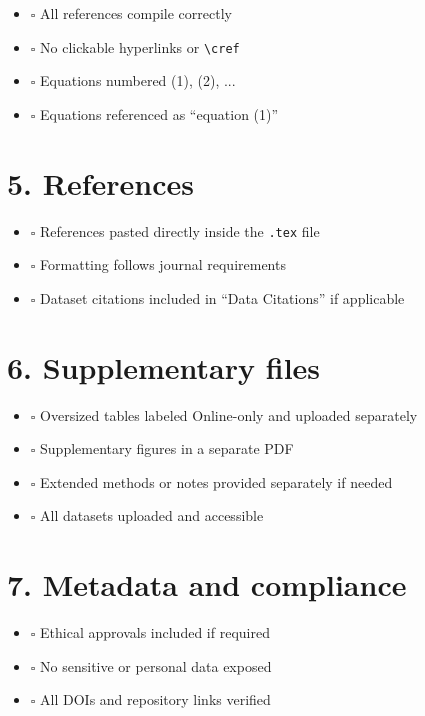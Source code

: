 \documentclass[11pt]{article}
\newcommand{\cbox}{$\square$ }
\begin{document}
\begin{itemize}[leftmargin=1.2cm]
    \item \cbox All references compile correctly
    \item \cbox No clickable hyperlinks or \texttt{\textbackslash cref}
    \item \cbox Equations numbered (1), (2), ...
    \item \cbox Equations referenced as ``equation (1)''
\end{itemize}

\section*{5. References}

\begin{itemize}[leftmargin=1.2cm]
    \item \cbox References pasted directly inside the \texttt{.tex} file
    \item \cbox Formatting follows journal requirements
    \item \cbox Dataset citations included in ``Data Citations'' if applicable
\end{itemize}

\section*{6. Supplementary files}

\begin{itemize}[leftmargin=1.2cm]
    \item \cbox Oversized tables labeled Online-only and uploaded separately
    \item \cbox Supplementary figures in a separate PDF
    \item \cbox Extended methods or notes provided separately if needed
    \item \cbox All datasets uploaded and accessible
\end{itemize}

\section*{7. Metadata and compliance}

\begin{itemize}[leftmargin=1.2cm]
    \item \cbox Ethical approvals included if required
    \item \cbox No sensitive or personal data exposed
    \item \cbox All DOIs and repository links verified
\end{itemize}
\end{document}
